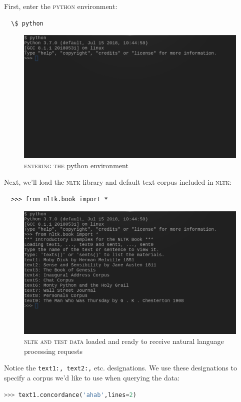 First, enter the \textsc{python} environment:
\begin{lstlisting}
  \$ python
\end{lstlisting}
\begin{figure}[ht]
\centering
\includegraphics[width=\textwidth]{media/images/python_prompt.png}
  \caption{\textsc{entering the} python environment}
\end{figure}
Next, we'll load the \textsc{nltk} library and default text corpus included in \textsc{nltk}:
\begin{lstlisting}
  >>> from nltk.book import *
\end{lstlisting}
\begin{figure}[ht]
\centering
\includegraphics[width=\textwidth]{media/images/nltk_book.png}
  \caption{\textsc{nltk and test data} loaded and ready to receive natural
    language processing requests}
\end{figure}
Notice the \texttt{\small{text1:, text2:,}} etc. designations. We use these designations
to specify a corpus we'd like to use when querying the data:
\begin{lstlisting}[language=Python]
  >>> text1.concordance('ahab',lines=2)
\end{lstlisting}
